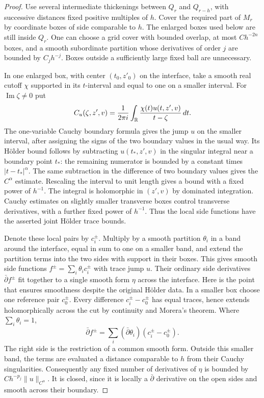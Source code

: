 \begin{proof}
Use several intermediate thickenings between $Q_r$ and $Q_{r-h}$,
with successive distances fixed positive multiples of $h$. Cover the
required part of $M_r$ by coordinate boxes of side comparable to $h$.
The enlarged boxes used below are still inside $Q_r$. One can choose a
grid cover with bounded overlap, at most $C h^{-2n}$ boxes, and a smooth
subordinate partition whose derivatives of order $j$ are bounded by
$C_jh^{-j}$. Boxes outside a sufficiently large fixed ball are unnecessary.

In one enlarged box, with center $(t_0,z'_0)$ on the interface, take a
smooth real cutoff $\chi$ supported in its $t$-interval and equal to one
on a smaller interval. For $\operatorname{Im}\zeta\ne0$ put
\[
 C_u(\zeta,z',v)=\frac{1}{2\pi i}
       \int_\mathbb R\frac{\chi(t)u(t,z',v)}{t-\zeta}\,dt.
\]
The one-variable Cauchy boundary formula gives the jump $u$ on the
smaller interval, after assigning the signs of the two boundary values
in the usual way. Its H\"older bound follows by subtracting
$u(t_*,z',v)$ in the singular integral near a boundary point $t_*$:
the remaining numerator is bounded by a constant times
$|t-t_*|^\alpha$. The same subtraction in the difference of two boundary
values gives the $C^\alpha$ estimate. Rescaling the interval to unit
length gives a bound with a fixed power of $h^{-1}$.
The integral is holomorphic in $(z',v)$ by dominated integration.
Cauchy estimates on slightly smaller transverse boxes control transverse
derivatives, with a further fixed power of $h^{-1}$. Thus the local
side functions have the asserted joint H\"older trace bounds.

Denote these local pairs by $c_i^\pm$. Multiply by a smooth partition
$\theta_i$ in a band around the interface, equal in sum to one on a
smaller band, and extend the partition terms into the two sides with
support in their boxes. This gives smooth side functions
$f^\pm=\sum_i\theta_i c_i^\pm$ with trace jump $u$.
Their ordinary side derivatives $\bar\partial f^\pm$ fit together to a
single smooth form $\eta$ across the interface. Here is the point that
ensures smoothness despite the original H\"older data. In a smaller box
choose one reference pair $c_0^\pm$. Every difference
$c_i^\pm-c_0^\pm$ has equal traces, hence extends holomorphically across
the cut by continuity and Morera's theorem. Where $\sum_i\theta_i=1$,
\[
 \bar\partial f^\pm
    =\sum_i(\bar\partial\theta_i)(c_i^\pm-c_0^\pm).
\]
The right side is the restriction of a common smooth form.
Outside this smaller band, the terms are evaluated a distance comparable
to $h$ from their Cauchy singularities. Consequently any fixed number of
derivatives of $\eta$ is bounded by $C h^{-p_j}\|u\|_{C^\alpha}$.
It is closed, since it is locally a $\bar\partial$ derivative on the
open sides and smooth across their boundary.


\end{proof}
